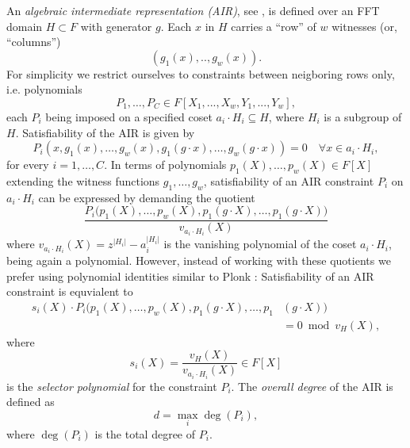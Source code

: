 \documentclass[11pt,article,oneside]{memoir}
\theoremstyle{definition}
\theoremstyle{remark}
\begin{document}
An \textit{algebraic intermediate representation (AIR)}, see \cite{Starks, DEEPFRI, ethSTARK}, is defined over an FFT domain $H\subset F$ with generator $g$. 
Each $x$ in $H$ carries a “row” of $w$ witnesses (or, “columns”)
\[
(g_1(x),.., g_w(x)).
\]
For simplicity we restrict ourselves to constraints between neigboring rows only, i.e. polynomials 
\[
P_1, \ldots ,P_{C}\in F[X_1,...,X_w,Y_1,...,Y_w],  
\] 
each $P_i$ being imposed on a specified coset $a_i\cdot H_i\subseteq H$, where $H_i$ is a subgroup of $H$.
 Satisfiability of the AIR is given by 
\begin{equation}
\label{e:AIRConstraint}
P_i(x, g_1(x),\ldots ,g_w(x),g_1(g\cdot x), \ldots,g_w(g\cdot x)) = 0 \quad \forall x \in a_i\cdot H_i,
\end{equation}
for every $i=1,\ldots,C$.
In terms of polynomials $p_1(X),\ldots, p_w(X)\in F[X]$ extending the witness functions $g_1, \ldots, g_w$, satisfiability of an AIR constraint $P_i$ on $a_i\cdot H_i$ can be expressed by demanding the quotient
\[
\frac{P_i\big(p_1(X), \ldots, p_w(X), p_1(g\cdot X), \ldots, p_1(g\cdot X)\big) }{ v_{a_i\cdot H_i}(X)}
\]
where $v_{a_i\cdot H_i}(X) = z^{|H_i|} - a_i^{|H_i|}$ is the vanishing polynomial of the coset $a_i\cdot H_i$, being again a polynomial.
However, instead of working with these quotients we prefer using polynomial identities similar to Plonk \cite{Plonk}:
Satisfiability of an AIR constraint is equvialent to 
\begin{equation}
\label{e:AIRConstraintIdentity}
\begin{aligned}
s_i(X) \cdot P_i\big(p_1(X), \ldots, p_w(X), p_1(g\cdot X), \ldots, p_1&(g\cdot X)\big) 
\\
&= 0 \bmod v_H(X),
\end{aligned}
\end{equation}
where  
\begin{equation}
\label{e:SelectorPoly}
s_i(X) =\frac{v_H(X)}{v_{a_i\cdot H_i}(X)}  \in F[X]
\end{equation}
is the \textit{selector polynomial} for the constraint $P_i$.
The \textit{overall degree} of the AIR is defined as
\[
d = \max_i \deg(P_i),
\]
where $\deg(P_i)$ is the total degree of $P_i$.


\end{document}
